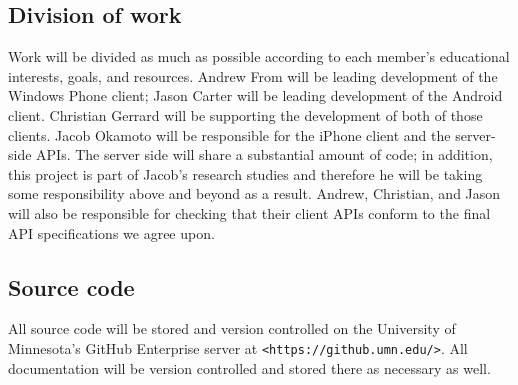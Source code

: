 \documentclass[11pt]{article} %
\begin{document}
\subsection{Division of work}
Work will be divided as much as possible according to each member's educational interests, goals, and resources. Andrew From will be leading development of the Windows Phone client; Jason Carter will be leading development of the Android client. Christian Gerrard will be supporting the development of both of those clients. Jacob Okamoto will be responsible for the iPhone client and the server-side APIs. The server side will share a substantial amount of code; in addition, this project is part of Jacob's research studies and therefore he will be taking some responsibility above and beyond as a result. Andrew, Christian, and Jason will also be responsible for checking that their client APIs conform to the final API specifications we agree upon.

\subsection{Source code}
All source code will be stored and version controlled on the University of Minnesota's GitHub Enterprise server at \texttt{<https://github.umn.edu/>}. All documentation will be version controlled and stored there as necessary as well.
\end{document}
